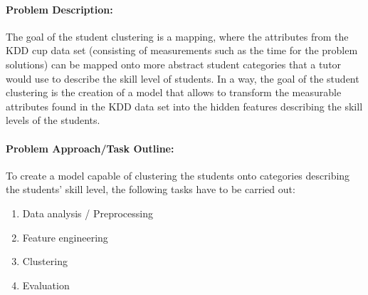 \paragraph{Problem Description:}

The goal of the student clustering is a mapping, where the attributes from the KDD cup data set (consisting of measurements such as the time for the problem solutions) can be mapped onto more abstract student categories that a tutor would use to describe the skill level of students. In a way, the goal of the student clustering is the creation of a model that allows to transform the measurable attributes found in the KDD data set into the hidden features describing the skill levels of the students.

\paragraph{Problem Approach/Task Outline:}

To create a model capable of clustering the students onto categories describing the students’ skill level, the following tasks have to be carried out:

\begin{enumerate}
	\item Data analysis / Preprocessing
	\item Feature engineering
	\item Clustering
	\item Evaluation
\end{enumerate}

